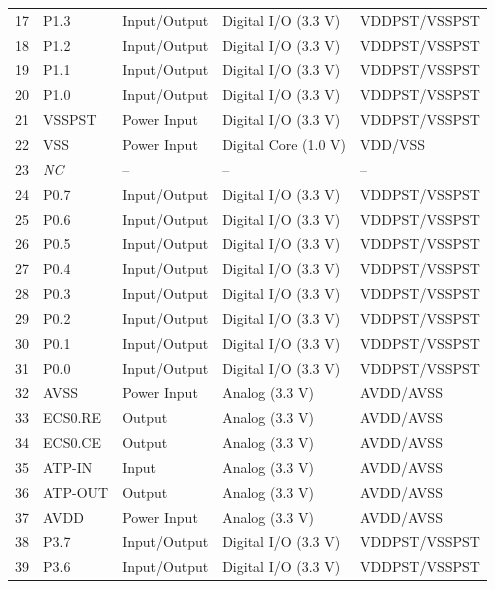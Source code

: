 \begin{longtable}[c]{ l l l l l }
17 & P1.3 & Input/Output & Digital I/O (3.3 V) & VDDPST/VSSPST \\
\rowcolor{tablehighlightcolor} 18 & P1.2 & Input/Output & Digital I/O (3.3 V) & VDDPST/VSSPST \\
19 & P1.1 & Input/Output & Digital I/O (3.3 V) & VDDPST/VSSPST \\
\rowcolor{tablehighlightcolor} 20 & P1.0 & Input/Output & Digital I/O (3.3 V) & VDDPST/VSSPST \\
21 & VSSPST & Power Input & Digital I/O (3.3 V) & VDDPST/VSSPST \\
\rowcolor{tablehighlightcolor} 22 & VSS & Power Input & Digital Core (1.0 V) & VDD/VSS \\
\hline 
23 & \textit{NC} & -- & -- & -- \\
\rowcolor{tablehighlightcolor} 24 & P0.7 & Input/Output & Digital I/O (3.3 V) & VDDPST/VSSPST \\
25 & P0.6 & Input/Output & Digital I/O (3.3 V) & VDDPST/VSSPST \\
\rowcolor{tablehighlightcolor} 26 & P0.5 & Input/Output & Digital I/O (3.3 V) & VDDPST/VSSPST \\
27 & P0.4 & Input/Output & Digital I/O (3.3 V) & VDDPST/VSSPST \\
\rowcolor{tablehighlightcolor} 28 & P0.3 & Input/Output & Digital I/O (3.3 V) & VDDPST/VSSPST \\
29 & P0.2 & Input/Output & Digital I/O (3.3 V) & VDDPST/VSSPST \\
\rowcolor{tablehighlightcolor} 30 & P0.1 & Input/Output & Digital I/O (3.3 V) & VDDPST/VSSPST \\
31 & P0.0 & Input/Output & Digital I/O (3.3 V) & VDDPST/VSSPST \\
\rowcolor{tablehighlightcolor} 32 & AVSS & Power Input & Analog (3.3 V) & AVDD/AVSS \\
33 & ECS0.RE & Output & Analog (3.3 V) & AVDD/AVSS \\
\hline 
\rowcolor{tablehighlightcolor} 34 & ECS0.CE & Output & Analog (3.3 V) & AVDD/AVSS \\
35 & ATP-IN & Input & Analog (3.3 V) & AVDD/AVSS \\
\rowcolor{tablehighlightcolor} 36 & ATP-OUT & Output & Analog (3.3 V) & AVDD/AVSS \\
37 & AVDD & Power Input & Analog (3.3 V) & AVDD/AVSS \\
\rowcolor{tablehighlightcolor} 38 & P3.7 & Input/Output & Digital I/O (3.3 V) & VDDPST/VSSPST \\
39 & P3.6 & Input/Output & Digital I/O (3.3 V) & VDDPST/VSSPST \\

\end{longtable}

